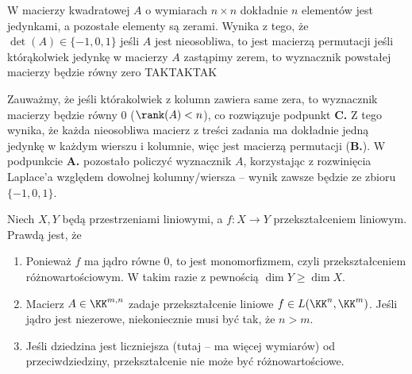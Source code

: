 \begin{solutions}
    \sol W macierzy kwadratowej $A$ o wymiarach $n \times n$ dokładnie $n$ elementów jest jedynkami, a pozostałe elementy są zerami. Wynika z tego, że
    \answerss
    {$\det(A) \in \{-1, 0, 1\}$}
    {jeśli $A$ jest nieosobliwa, to jest macierzą permutacji}
    {jeśli którąkolwiek jedynkę w macierzy $A$ zastąpimy zerem, to wyznacznik powstałej macierzy będzie równy zero}
    {TAK}{TAK}{TAK}
    
    Zauważmy, że jeśli którakolwiek z kolumn zawiera same zera, to wyznacznik macierzy będzie równy 0 ($\rank(A) < n$), co rozwiązuje podpunkt \textbf{C.} Z tego wynika, że każda nieosobliwa macierz z treści zadania ma dokładnie jedną jedynkę w każdym wierszu i kolumnie, więc jest macierzą permutacji (\textbf{B.}). W podpunkcie \textbf{A.} pozostało policzyć wyznacznik $A$, korzystając z rozwinięcia Laplace'a względem dowolnej kolumny/wiersza -- wynik zawsze będzie ze zbioru $\{-1, 0, 1\}$.

    \sol Niech $X, Y$ będą przestrzeniami liniowymi, a $f: X \to Y$ przekształceniem liniowym. Prawdą jest, że

    \begin{enumerate}[\bf A.]
        \item Ponieważ $f$ ma jądro równe $0$, to jest monomorfizmem, czyli przekształceniem różnowartościowym. W takim razie z pewnością $\dim Y \geq \dim X$.

        \item Macierz $A\in\KK^{m,n}$ zadaje przekształcenie liniowe $f\in L(\KK^n, \KK^m)$. Jeśli jądro jest niezerowe, niekoniecznie musi być tak, że $n>m$.

        \item Jeśli dziedzina jest liczniejsza (tutaj -- ma więcej wymiarów) od przeciwdziedziny, przekształcenie nie może być różnowartościowe.
    \end{enumerate}


\end{solutions}
